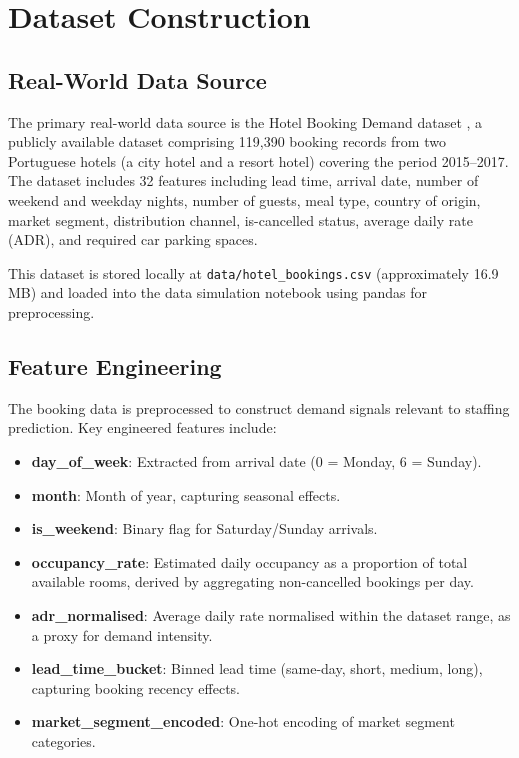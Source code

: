 \section{Dataset Construction}

\subsection{Real-World Data Source}

The primary real-world data source is the Hotel Booking Demand dataset \cite{antonio_et_al_2019}, a publicly available dataset comprising 119,390 booking records from two Portuguese hotels (a city hotel and a resort hotel) covering the period 2015--2017. The dataset includes 32 features including lead time, arrival date, number of weekend and weekday nights, number of guests, meal type, country of origin, market segment, distribution channel, is-cancelled status, average daily rate (ADR), and required car parking spaces.

This dataset is stored locally at \texttt{data/hotel\_bookings.csv} (approximately 16.9 MB) and loaded into the data simulation notebook using pandas for preprocessing.

\subsection{Feature Engineering}

The booking data is preprocessed to construct demand signals relevant to staffing prediction. Key engineered features include:

\begin{itemize}
    \item \textbf{day\_of\_week}: Extracted from arrival date (0 = Monday, 6 = Sunday).
    \item \textbf{month}: Month of year, capturing seasonal effects.
    \item \textbf{is\_weekend}: Binary flag for Saturday/Sunday arrivals.
    \item \textbf{occupancy\_rate}: Estimated daily occupancy as a proportion of total available rooms, derived by aggregating non-cancelled bookings per day.
    \item \textbf{adr\_normalised}: Average daily rate normalised within the dataset range, as a proxy for demand intensity.
    \item \textbf{lead\_time\_bucket}: Binned lead time (same-day, short, medium, long), capturing booking recency effects.
    \item \textbf{market\_segment\_encoded}: One-hot encoding of market segment categories.
\end{itemize}

